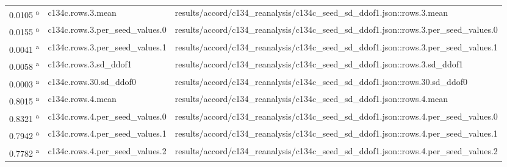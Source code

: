 \begin{longtable}{@{}p{0.7in}p{1.9in}p{2.6in}@{}}
0.0105 \textsuperscript{a} & c134c.\allowbreak{}rows.\allowbreak{}3.\allowbreak{}mean & results/\allowbreak{}accord/\allowbreak{}c134\_reanalysis/\allowbreak{}c134c\_seed\_sd\_ddof1.\allowbreak{}json::rows.\allowbreak{}3.\allowbreak{}mean\\
0.0155 \textsuperscript{a} & c134c.\allowbreak{}rows.\allowbreak{}3.\allowbreak{}per\_seed\_values.\allowbreak{}0 & results/\allowbreak{}accord/\allowbreak{}c134\_reanalysis/\allowbreak{}c134c\_seed\_sd\_ddof1.\allowbreak{}json::rows.\allowbreak{}3.\allowbreak{}per\_seed\_values.\allowbreak{}0\\
0.0041 \textsuperscript{a} & c134c.\allowbreak{}rows.\allowbreak{}3.\allowbreak{}per\_seed\_values.\allowbreak{}1 & results/\allowbreak{}accord/\allowbreak{}c134\_reanalysis/\allowbreak{}c134c\_seed\_sd\_ddof1.\allowbreak{}json::rows.\allowbreak{}3.\allowbreak{}per\_seed\_values.\allowbreak{}1\\
0.0058 \textsuperscript{a} & c134c.\allowbreak{}rows.\allowbreak{}3.\allowbreak{}sd\_ddof1 & results/\allowbreak{}accord/\allowbreak{}c134\_reanalysis/\allowbreak{}c134c\_seed\_sd\_ddof1.\allowbreak{}json::rows.\allowbreak{}3.\allowbreak{}sd\_ddof1\\
0.0003 \textsuperscript{a} & c134c.\allowbreak{}rows.\allowbreak{}30.\allowbreak{}sd\_ddof0 & results/\allowbreak{}accord/\allowbreak{}c134\_reanalysis/\allowbreak{}c134c\_seed\_sd\_ddof1.\allowbreak{}json::rows.\allowbreak{}30.\allowbreak{}sd\_ddof0\\
0.8015 \textsuperscript{a} & c134c.\allowbreak{}rows.\allowbreak{}4.\allowbreak{}mean & results/\allowbreak{}accord/\allowbreak{}c134\_reanalysis/\allowbreak{}c134c\_seed\_sd\_ddof1.\allowbreak{}json::rows.\allowbreak{}4.\allowbreak{}mean\\
0.8321 \textsuperscript{a} & c134c.\allowbreak{}rows.\allowbreak{}4.\allowbreak{}per\_seed\_values.\allowbreak{}0 & results/\allowbreak{}accord/\allowbreak{}c134\_reanalysis/\allowbreak{}c134c\_seed\_sd\_ddof1.\allowbreak{}json::rows.\allowbreak{}4.\allowbreak{}per\_seed\_values.\allowbreak{}0\\
0.7942 \textsuperscript{a} & c134c.\allowbreak{}rows.\allowbreak{}4.\allowbreak{}per\_seed\_values.\allowbreak{}1 & results/\allowbreak{}accord/\allowbreak{}c134\_reanalysis/\allowbreak{}c134c\_seed\_sd\_ddof1.\allowbreak{}json::rows.\allowbreak{}4.\allowbreak{}per\_seed\_values.\allowbreak{}1\\
0.7782 \textsuperscript{a} & c134c.\allowbreak{}rows.\allowbreak{}4.\allowbreak{}per\_seed\_values.\allowbreak{}2 & results/\allowbreak{}accord/\allowbreak{}c134\_reanalysis/\allowbreak{}c134c\_seed\_sd\_ddof1.\allowbreak{}json::rows.\allowbreak{}4.\allowbreak{}per\_seed\_values.\allowbreak{}2\\

\end{longtable}
